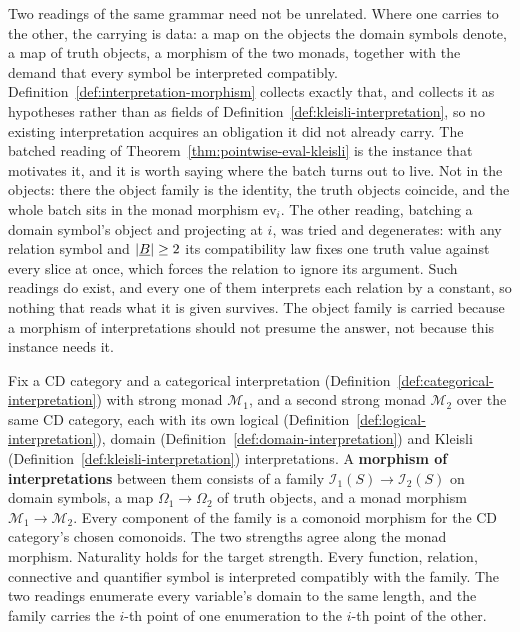 Two readings of the same grammar need not be unrelated. Where one
carries to the other, the carrying is data: a map on the objects the
domain symbols denote, a map of truth objects, a morphism of the two
monads, together with the demand that every symbol be interpreted
compatibly. Definition~\ref{def:interpretation-morphism} collects
exactly that, and collects it as hypotheses rather than as fields of
Definition~\ref{def:kleisli-interpretation}, so no existing
interpretation acquires an obligation it did not already carry. The
batched reading of Theorem~\ref{thm:pointwise-eval-kleisli} is the
instance that motivates it, and it is worth saying where the batch turns
out to live. Not in the objects: there the object family is the
identity, the truth objects coincide, and the whole batch sits in the
monad morphism $\mathrm{ev}_i$. The other reading, batching a domain
symbol's object and projecting at $i$, was tried and degenerates: with
any relation symbol and $|\underline B| \ge 2$ its compatibility law fixes one
truth value against every slice at once, which forces the relation to
ignore its argument. Such readings do exist, and every one of them
interprets each relation by a constant, so nothing that reads what it is
given survives. The object family is carried
because a morphism of interpretations should not presume the answer, not
because this instance needs it.

\begin{definition}
\label{def:interpretation-morphism}
\leanok
Fix a CD category and a categorical interpretation
(Definition~\ref{def:categorical-interpretation}) with strong monad
$\mathcal M_1$, and a second strong monad $\mathcal M_2$ over the same
CD category, each with its own logical
(Definition~\ref{def:logical-interpretation}), domain
(Definition~\ref{def:domain-interpretation}) and Kleisli
(Definition~\ref{def:kleisli-interpretation}) interpretations. A
\textbf{morphism of interpretations} between them consists of a family
$\mathcal I_1(S) \to \mathcal I_2(S)$ on domain symbols, a map
$\Omega_1 \to \Omega_2$ of truth objects, and a monad morphism
$\mathcal M_1 \to \mathcal M_2$. Every component of the family is a
comonoid morphism for the CD category's chosen comonoids. The two
strengths agree along the monad morphism. Naturality holds for the target
strength. Every function, relation, connective and quantifier symbol is
interpreted compatibly with the family. The two readings enumerate every
variable's domain to the same length, and the family carries the $i$-th
point of one enumeration to the $i$-th point of the other.
\end{definition}

